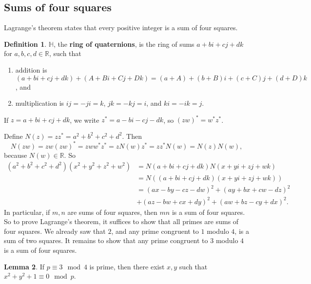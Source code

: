 \documentclass{article}
\newcommand{\R}{\mathbb{R}}
\renewcommand{\H}{\mathbb{H}}
\newcommand{\rb}[1]{\left( #1 \right)}
\theoremstyle{definition}\newtheorem{definition}{Definition}
\theoremstyle{definition}\newtheorem*{remark}{Remark}
\theoremstyle{definition}\newtheorem*{example}{Example}
\theoremstyle{definition}\newtheorem*{note}{Note}
\newtheorem{lemma}[definition]{Lemma}
\begin{document}
\subsection{Sums of four squares}

Lagrange's theorem states that every positive integer is a sum of four squares.

\begin{definition}
$ \H $, the \textbf{ring of quaternions}, is the ring of sums $ a + bi + cj + dk $ for $ a, b, c, d \in \R $, such that
\begin{enumerate}
\item addition is $ \rb{a + bi + cj + dk} + \rb{A + Bi + Cj + Dk} = \rb{a + A} + \rb{b + B}i + \rb{c + C}j + \rb{d + D}k $, and
\item multiplication is $ ij = -ji = k $, $ jk = -kj = i $, and $ ki = -ik = j $.
\end{enumerate}
If $ z = a + bi + cj + dk $, we write $ z^* = a - bi - cj - dk $, so $ \rb{zw}^* = w^*z^* $.
\end{definition}

Define $ N\rb{z} = zz^* = a^2 + b^2 + c^2 + d^2 $. Then
$$ N\rb{zw} = zw\rb{zw}^* = zww^*z^* =  zN\rb{w}z^* = zz^*N\rb{w} = N\rb{z}N\rb{w}, $$
because $ N\rb{w} \in \R $. So
\begin{align*}
\rb{a^2 + b^2 + c^2 + d^2}\rb{x^2 + y^2 + z^2 + w^2}
& = N\rb{a + bi + cj + dk}N\rb{x + yi + zj + wk} \\
& = N\rb{\rb{a + bi + cj + dk}\rb{x + yi + zj + wk}} \\
& = \rb{ax - by - cz - dw}^2 + \rb{ay + bx + cw - dz}^2 \\
& + \rb{az - bw + cx + dy}^2 + \rb{aw + bz - cy + dx}^2.
\end{align*}
In particular, if $ m, n $ are sums of four squares, then $ mn $ is a sum of four squares. So to prove Lagrange's theorem, it suffices to show that all primes are sums of four squares. We already saw that $ 2 $, and any prime congruent to $ 1 $ modulo $ 4 $, is a sum of two squares. It remains to show that any prime congruent to $ 3 $ modulo $ 4 $ is a sum of four squares.


\begin{lemma}
If $ p \equiv 3 \mod 4 $ is prime, then there exist $ x, y $ such that $ x^2 + y^2 + 1 \equiv 0 \mod p $.
\end{lemma}
\end{document}
